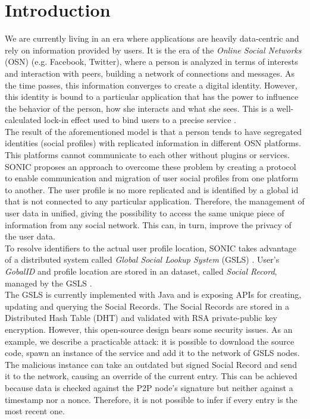 \section{Introduction}
\label{S:1}

We are currently living in an era where applications are heavily data-centric and rely on information provided by users. It is the era of the \textit{Online Social Networks} (OSN) \cite{gondor_sonic:_2014} (e.g. Facebook, Twitter), where a person is analyzed in terms of interests and interaction with peers, building a network of connections and messages. As the time passes, this information converges to create a digital identity. However, this identity is bound to a particular application that has the power to influence the behavior of the person, how she interacts and what she sees. This is a well-calculated lock-in effect used to bind users to a precise service \cite{gondor_distributed_2016}. 
\\

The result of the aforementioned model is that a person tends to have segregated identities (social profiles) with replicated information in different OSN platforms. This platforms cannot communicate to each other without plugins or services. SONIC proposes an approach to overcome these problem by creating a protocol to enable communication and migration of user social profiles from one platform to another. The user profile is no more replicated and is identified by a global id that is not connected to any particular application. Therefore, the management of user data in unified, giving the possibility to access the same unique piece of information from any social network. This can, in turn, improve the privacy of the user data. 
\\

To resolve identifiers to the actual user profile location, SONIC takes advantage of a distributed system called \textit{Global Social Lookup System} (GSLS) \cite{gondor_distributed_2016}. User's \textit{GobalID} and profile location are stored in an dataset, called \textit{Social Record}, managed by the GSLS \cite{gondor_distributed_2016}.
\\

The GSLS is currently implemented with Java and is exposing APIs for creating, updating and querying the Social Records. The Social Records are stored in a Distributed Hash Table (DHT) and validated with RSA private-public key encryption. However, this open-source design bears some security issues. As an example, we describe a practicable attack: it is possible to download the source code, spawn an instance of the service and add it to the network of GSLS nodes. The malicious instance can take an outdated but signed Social Record and send it to the network, causing an override of the current entry. This can be achieved because data is checked against the P2P node's signature but neither against a timestamp nor a nonce. Therefore, it is not possible to infer if every entry is the most recent one. 
\\

